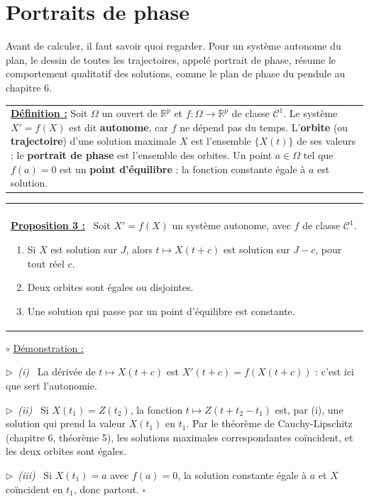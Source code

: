\documentclass[a4paper,twoside]{report}
\makeatletter
\newcommand{\mot}[1]{\textcolor{rougecours}{\textbf{#1}}}
\newenvironment{cadre}%
 {\par\vspace{2mm}\noindent\begin{tabular}{|@{\hspace{4mm}}p{0.93\textwidth}@{\hspace{4mm}}|}
  \hline \\[-2mm]}%
 {\\[2mm] \hline \end{tabular}\par\vspace{3mm}}
\newcommand{\propo}[1]{\textbf{\underline{Proposition #1 :}}~}
\newenvironment{demo}%
 {\par\needspace{4\baselineskip}\vspace{1mm}\noindent$\circ$ \underline{Démonstration :}~\setlength{\parskip}{3pt plus 1pt}}%
 {\hfill$\square$\par\vspace{2mm}}
\newcommand{\etape}[1]{\par\smallskip\noindent$\triangleright$~\textit{#1}~}
\newcommand{\R}{\mathbb{R}}
\newcommand{\Cc}{\mathcal{C}}                     %
\makeatother
\begin{document}
\section{Portraits de phase}

Avant de calculer, il faut savoir quoi regarder. Pour un système autonome du plan, le dessin de toutes les trajectoires, appelé portrait de phase, résume le comportement qualitatif des solutions, comme le plan de phase du pendule au chapitre 6.

\begin{center}
\begin{tabularx}{15cm}{||X}
\noindent \textbf{\underline{Définition :}} Soit $\Omega$ un ouvert de $\R^{p}$ et $f : \Omega \to \R^{p}$ de classe $\Cc^{1}$. Le système $X' = f(X)$ est dit \mot{autonome}, car $f$ ne dépend pas du temps. L'\mot{orbite} (ou \mot{trajectoire}) d'une solution maximale $X$ est l'ensemble $\{X(t)\}$ de ses valeurs ; le \mot{portrait de phase} est l'ensemble des orbites. Un point $a \in \Omega$ tel que $f(a) = 0$ est un \mot{point d'équilibre} : la fonction constante égale à $a$ est solution.
\end{tabularx}
\end{center}

\begin{cadre}
\propo{3} Soit $X' = f(X)$ un système autonome, avec $f$ de classe $\Cc^{1}$.
\begin{enumerate}[label=(\roman*),topsep=3pt,itemsep=3pt]
  \item Si $X$ est solution sur $J$, alors $t \mapsto X(t + c)$ est solution sur $J - c$, pour tout réel $c$.
  \item Deux orbites sont égales ou disjointes.
  \item Une solution qui passe par un point d'équilibre est constante.
\end{enumerate}
\end{cadre}

\begin{demo}
\etape{(i)} La dérivée de $t \mapsto X(t + c)$ est $X'(t + c) = f(X(t + c))$ : c'est ici que sert l'autonomie.

\etape{(ii)} Si $X(t_{1}) = Z(t_{2})$, la fonction $t \mapsto Z(t + t_{2} - t_{1})$ est, par (i), une solution qui prend la valeur $X(t_{1})$ en $t_{1}$. Par le théorème de Cauchy-Lipschitz (chapitre 6, théorème 5), les solutions maximales correspondantes coïncident, et les deux orbites sont égales.

\etape{(iii)} Si $X(t_{1}) = a$ avec $f(a) = 0$, la solution constante égale à $a$ et $X$ coïncident en $t_{1}$, donc partout.
\end{demo}
\end{document}

